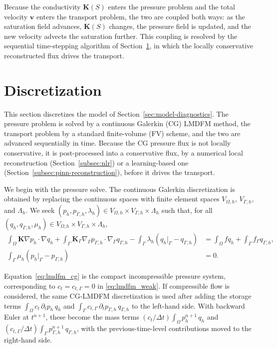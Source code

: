 \documentclass[a4paper,fleqn]{cas-sc}
\newcommand{\Kmat}{\mathbf{K}}
\newcommand{\vflux}{\mathbf{v}}
\begin{document}
Because the conductivity \(\Kmat(S)\) enters the pressure problem and the total
velocity \(\vflux\) enters the transport problem, the two are coupled both ways:
as the saturation field advances, \(\Kmat(S)\) changes, the pressure field is
updated, and the new velocity advects the saturation further. This coupling is
resolved by the sequential time-stepping algorithm of
Section~\ref{sec:flux-reconstruction}, in which the locally conservative
reconstructed flux drives the transport.

\section{Discretization}
\label{sec:flux-reconstruction}

This section discretizes the model of Section~\ref{sec:model-diagnostics}. The
pressure problem is solved by a continuous Galerkin (CG) LMDFM method, the
transport problem by a standard finite-volume (FV) scheme, and the two are
advanced sequentially in time. Because the CG pressure flux is not locally
conservative, it is post-processed into a conservative flux, by a numerical local
reconstruction (Section~\ref{subsec:nlr}) or a learning-based one
(Section~\ref{subsec:pinn-reconstruction}), before it drives the transport.

We begin with the pressure solve. The continuous Galerkin discretization is
obtained by replacing the continuous
spaces with finite element spaces \(V_{\Omega,h}\), \(V_{\Gamma,h}\), and
\(\Lambda_h\). We seek
\((p_h,p_{\Gamma,h},\lambda_h)\in V_{\Omega,h}\times V_{\Gamma,h}\times
\Lambda_h\) such that, for all
\((q_h,q_{\Gamma,h},\mu_h)\in V_{\Omega,h}\times V_{\Gamma,h}\times\Lambda_h\),
\begin{equation}
\begin{aligned}
\int_\Omega \Kmat\nabla p_h\cdot\nabla q_h
+\int_\Gamma \Kmat_\Gamma\nabla_\Gamma p_{\Gamma,h}\cdot\nabla_\Gamma q_{\Gamma,h}
-\int_\Gamma \lambda_h\left(q_h|_\Gamma-q_{\Gamma,h}\right)
&=
\int_\Omega f q_h
+\int_\Gamma f_\Gamma q_{\Gamma,h},\\
\int_\Gamma \mu_h\left(p_h|_\Gamma-p_{\Gamma,h}\right)&=0.
\end{aligned}
\label{eq:lmdfm_cg}
\end{equation}

Equation~\eqref{eq:lmdfm_cg} is the compact incompressible pressure system,
corresponding to \(c_t=c_{t,\Gamma}=0\) in \eqref{eq:lmdfm_weak}. If
compressible flow is considered, the same CG-LMDFM discretization is used after
adding the storage terms
\(\int_\Omega c_t\,\partial_t p_h\,q_h\) and
\(\int_\Gamma c_{t,\Gamma}\,\partial_t p_{\Gamma,h}\,q_{\Gamma,h}\) to the
left-hand side. With backward Euler at \(t^{n+1}\), these become the mass terms
\((c_t/\Delta t)\int_\Omega p_h^{n+1}\,q_h\) and
\((c_{t,\Gamma}/\Delta t)\int_\Gamma p_{\Gamma,h}^{n+1}\,q_{\Gamma,h}\), with the
previous-time-level contributions moved to the right-hand side.
\end{document}
